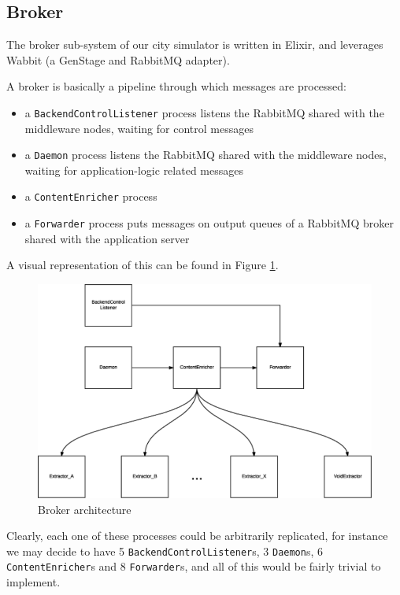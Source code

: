 \subsection{Broker}\label{sec:impl-broker}

The broker sub-system of our city simulator is written in Elixir, and leverages
Wabbit (a GenStage and RabbitMQ adapter).

A broker is basically a pipeline through which messages are processed:

\begin{itemize}
  \item a \texttt{BackendControlListener} process listens the RabbitMQ shared
    with the middleware nodes, waiting for control messages
  \item a \texttt{Daemon} process listens the RabbitMQ shared with the
    middleware nodes, waiting for application-logic related messages
  \item a \texttt{ContentEnricher} process %
  \item a \texttt{Forwarder} process puts messages on output queues of a
    RabbitMQ broker shared with the application server
\end{itemize}

A visual representation of this can be found in Figure \ref{fig:broker-arch}.

\begin{figure}[H]
  \centering
  \includegraphics[width=\columnwidth]{images/implementation/broker.eps}
  \caption{Broker architecture}
  \label{fig:broker-arch}
\end{figure}

Clearly, each one of these processes could be arbitrarily replicated, for
instance we may decide to have 5 \texttt{BackendControlListener}s, 3
\texttt{Daemon}s, 6 \texttt{ContentEnricher}s and 8 \texttt{Forwarder}s, and
all of this would be fairly trivial to implement.

